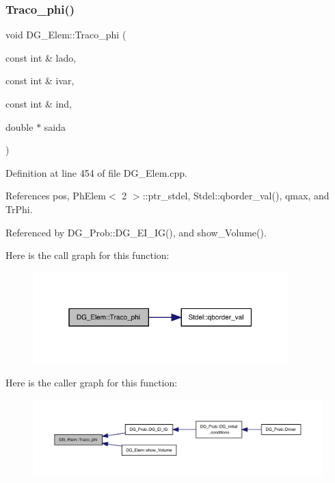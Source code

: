 \subsubsection{\texorpdfstring{Traco\+\_\+phi()}{Traco\_phi()}}
{\footnotesize\ttfamily void D\+G\+\_\+\+Elem\+::\+Traco\+\_\+phi (\begin{DoxyParamCaption}\item[{const int \&}]{lado,  }\item[{const int \&}]{ivar,  }\item[{const int \&}]{ind,  }\item[{double $\ast$}]{saida }\end{DoxyParamCaption})}



Definition at line 454 of file D\+G\+\_\+\+Elem.\+cpp.



References pos, Ph\+Elem$<$ 2 $>$\+::ptr\+\_\+stdel, Stdel\+::qborder\+\_\+val(), qmax, and Tr\+Phi.



Referenced by D\+G\+\_\+\+Prob\+::\+D\+G\+\_\+\+E\+I\+\_\+\+I\+G(), and show\+\_\+\+Volume().

Here is the call graph for this function\+:
\nopagebreak
\begin{figure}[H]
\begin{center}
\leavevmode
\includegraphics[width=280pt]{classDG__Elem_aa97824992d60c2a7b5506e5d660dc7a1_cgraph}
\end{center}
\end{figure}
Here is the caller graph for this function\+:
\nopagebreak
\begin{figure}[H]
\begin{center}
\leavevmode
\includegraphics[width=350pt]{classDG__Elem_aa97824992d60c2a7b5506e5d660dc7a1_icgraph}
\end{center}
\end{figure}
\mbox{\label{classDG__Elem_a99f9e69fc0d6eacd683712bc456af5f7}} 
